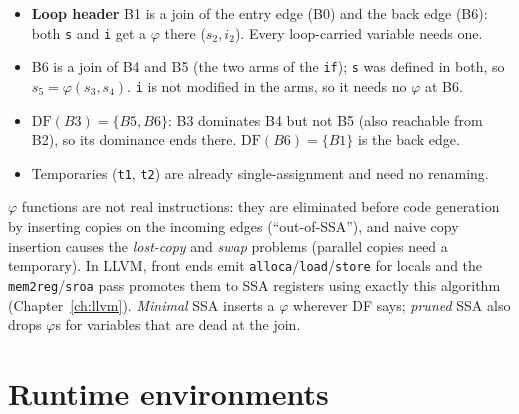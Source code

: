\documentclass[10pt,a4paper,openany,oneside]{report}
\newcommand{\prio}[1]{\texorpdfstring{\ifcase#1\or{\color{gold}\ding{72}}\or{\color{gold}\ding{72}\ding{72}}\or{\color{gold}\ding{72}\ding{72}\ding{72}}\fi}{}}
\begin{document}
\begin{exbox}
\begin{itemize}[nosep]
\item \textbf{Loop header} B1 is a join of the entry edge (B0) and the back edge (B6): both \texttt{s} and \texttt{i} get a $\varphi$ there ($s_2,i_2$). Every loop-carried variable needs one.
\item B6 is a join of B4 and B5 (the two arms of the \texttt{if}); \texttt{s} was defined in both, so $s_5=\varphi(s_3,s_4)$. \texttt{i} is not modified in the arms, so it needs no $\varphi$ at B6.
\item $\mathrm{DF}(B3)=\{B5,B6\}$: B3 dominates B4 but not B5 (also reachable from B2), so its dominance ends there. $\mathrm{DF}(B6)=\{B1\}$ is the back edge.
\item Temporaries (\texttt{t1}, \texttt{t2}) are already single-assignment and need no renaming.
\end{itemize}
\end{exbox}
\begin{trapbox}
$\varphi$ functions are not real instructions: they are eliminated before code generation by inserting copies on the incoming edges (``out-of-SSA''), and naive copy insertion causes the \emph{lost-copy} and \emph{swap} problems (parallel copies need a temporary). In LLVM, front ends emit \texttt{alloca}/\texttt{load}/\texttt{store} for locals and the \texttt{mem2reg}/\texttt{sroa} pass promotes them to SSA registers using exactly this algorithm (Chapter~\ref{ch:llvm}). \emph{Minimal} SSA inserts a $\varphi$ wherever DF says; \emph{pruned} SSA also drops $\varphi$s for variables that are dead at the join.
\end{trapbox}

\section{Runtime environments \prio{3}}
\end{document}
